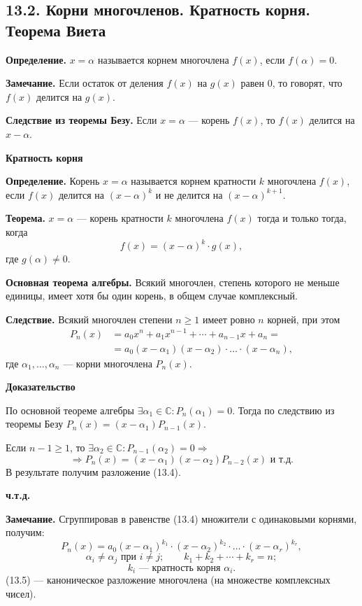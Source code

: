 \documentclass[12pt,a4paper]{article}
\begin{document}
\subsection*{\textbf{13.2. Корни многочленов. Кратность корня. Теорема Виета}}

\textbf{Определение.} $x=\alpha$ называется корнем многочлена $f(x)$,
если $f(\alpha)=0$.

\textbf{Замечание.} Если остаток от деления $f(x)$ на $g(x)$ равен 0,
то говорят, что $f(x)$ делится на $g(x)$.

\textbf{Следствие из теоремы Безу.} Если $x=\alpha$ --- корень
$f(x)$, то $f(x)$ делится на $x-\alpha$.

\textbf{Кратность корня}

\textbf{Определение.} Корень $x=\alpha$ называется корнем кратности
$k$ многочлена $f(x)$, если $f(x)$ делится на $(x-\alpha)^k$ и не
делится на $(x-\alpha)^{k+1}$.

\textbf{Теорема.} $x=\alpha$ --- корень кратности $k$ многочлена
$f(x)$ тогда и только тогда, когда
$$
f(x)=(x-\alpha)^k\cdot g(x),
$$
где $g(\alpha)\ne0$.

\textbf{Основная теорема алгебры.} Всякий многочлен, степень которого
не меньше единицы, имеет хотя бы один корень, в общем случае комплексный.

\textbf{Следствие.} Всякий многочлен степени $n\ge1$ имеет ровно $n$
корней, при этом
\begin{equation}
\begin{aligned}
P_n(x)&=a_0x^n+a_1x^{n-1}+\cdots+a_{n-1}x+a_n=\\
&=a_0(x-\alpha_1)(x-\alpha_2)\cdot\ldots\cdot(x-\alpha_n),
\end{aligned}
\tag{13.4}
\end{equation}
где $\alpha_1,\ldots,\alpha_n$ --- корни многочлена $P_n(x)$.

\textbf{Доказательство}

По основной теореме алгебры $\exists\alpha_1\in\mathbb C:
P_n(\alpha_1)=0$. Тогда по следствию из теоремы Безу
$P_n(x)=(x-\alpha_1)P_{n-1}(x)$.

Если $n-1\ge1$, то $\exists\alpha_2\in\mathbb C: P_{n-1}(\alpha_2)=0\Rightarrow$
$$
\Rightarrow P_n(x)=(x-\alpha_1)(x-\alpha_2)P_{n-2}(x) \text{ и т.д.}
$$
В результате получим разложение (13.4).

\textbf{ч.т.д.}

\textbf{Замечание.} Сгруппировав в равенстве (13.4) множители с
одинаковыми корнями, получим:
\begin{equation}
P_n(x)=a_0(x-\alpha_1)^{k_1}\cdot(x-\alpha_2)^{k_2}\cdot\ldots\cdot(x-\alpha_r)^{k_r},
\tag{13.5}
\end{equation}
$$
\alpha_i\ne\alpha_j \text{ при } i\ne j;\qquad k_1+k_2+\cdots+k_r=n;
$$
$$
k_i \text{ --- кратность корня } \alpha_i.
$$
(13.5) --- каноническое разложение многочлена (на множестве комплексных чисел).
\end{document}
